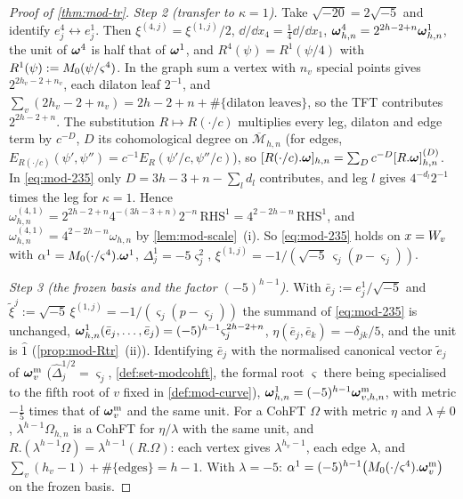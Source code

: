 \begin{proof}[Proof of \cref{thm:mod-tr}]
\emph{Step 2 (transfer to $\kappa=1$).} Take $\sqrt{-20}=2\sqrt{-5}$ and identify $e^4_j\leftrightarrow e^1_j$. Then $\xi^{(4,j)}=\xi^{(1,j)}/2$, $\dd/\dd x_4=\frac14\dd/\dd x_1$, $\boldsymbol{\omega}^4_{h,n}=2^{2h-2+n}\boldsymbol{\omega}^1_{h,n}$, the unit of $\boldsymbol{\omega}^4$ is half that of $\boldsymbol{\omega}^1$, and $R^4(\psi)=R^1(\psi/4)$ with $R^1(\psi):=M_{0}(\psi/\varsigma^4)$. In the graph sum a vertex with $n_v$ special points gives $2^{2h_v-2+n_v}$, each dilaton leaf $2^{-1}$, and $\sum_v(2h_v-2+n_v)=2h-2+n+\#\{\text{dilaton leaves}\}$, so the TFT contributes $2^{2h-2+n}$. The substitution $R\mapsto R(\cdot/c)$ multiplies every leg, dilaton and edge term by $c^{-D}$, $D$ its cohomological degree on $\overline{\mathcal M}_{h,n}$ (for edges, $E_{R(\cdot/c)}(\psi',\psi'')=c^{-1}E_R(\psi'/c,\psi''/c)$), so $[R(\cdot/c).\boldsymbol{\omega}]_{h,n}=\sum_Dc^{-D}[R.\boldsymbol{\omega}]^{(D)}_{h,n}$. In \eqref{eq:mod-235} only $D=3h-3+n-\sum_ld_l$ contributes, and leg $l$ gives $4^{-d_l}2^{-1}$ times the leg for $\kappa=1$. Hence $\omega^{(4,1)}_{h,n}=2^{2h-2+n}4^{-(3h-3+n)}2^{-n}\,\mathrm{RHS}^1=4^{2-2h-n}\,\mathrm{RHS}^1$, and $\omega^{(4,1)}_{h,n}=4^{2-2h-n}\omega_{h,n}$ by \cref{lem:mod-scale}~(i). So \eqref{eq:mod-235} holds on $x=W_{v}$ with $\alpha^1=M_{0}(\cdot/\varsigma^4).\boldsymbol{\omega}^1$, $\Delta^1_j=-5\varsigma_j^2$, $\xi^{(1,j)}=-1/(\sqrt{-5}\,\varsigma_j(p-\varsigma_j))$.

\emph{Step 3 (the frozen basis and the factor $(-5)^{h-1}$).} With $\bar e_j:=e^1_j/\sqrt{-5}$ and $\tilde\xi^j:=\sqrt{-5}\,\xi^{(1,j)}=-1/(\varsigma_j(p-\varsigma_j))$ the summand of \eqref{eq:mod-235} is unchanged, $\boldsymbol{\omega}^1_{h,n}(\bar e_j,\dots,\bar e_j)=(-5)^{h-1}\varsigma_j^{2h-2+n}$, $\eta(\bar e_j,\bar e_k)=-\delta_{jk}/5$, and the unit is $\hat 1$ (\cref{prop:mod-Rtr}~(ii)). Identifying $\bar e_j$ with the normalised canonical vector $\tilde e_j$ of $\boldsymbol{\omega}^{\mathrm m}_v$ ($\hat\Delta_j^{1/2}=\varsigma_j$, \cref{def:set-modcohft}, the formal root $\varsigma$ there being specialised to the fifth root of $v$ fixed in \cref{def:mod-curve}), $\boldsymbol{\omega}^1_{h,n}=(-5)^{h-1}\boldsymbol{\omega}^{\mathrm m}_{v,h,n}$, with metric $-\frac15$ times that of $\boldsymbol{\omega}^{\mathrm m}_v$ and the same unit. For a CohFT $\Omega$ with metric $\eta$ and $\lambda\neq 0$, $\lambda^{h-1}\Omega_{h,n}$ is a CohFT for $\eta/\lambda$ with the same unit, and $R.(\lambda^{h-1}\Omega)=\lambda^{h-1}(R.\Omega)$: each vertex gives $\lambda^{h_v-1}$, each edge $\lambda$, and $\sum_v(h_v-1)+\#\{\text{edges}\}=h-1$. With $\lambda=-5$: $\alpha^1=(-5)^{h-1}\big(M_{0}(\cdot/\varsigma^4).\boldsymbol{\omega}^{\mathrm m}_v\big)$ on the frozen basis.


\end{proof}
